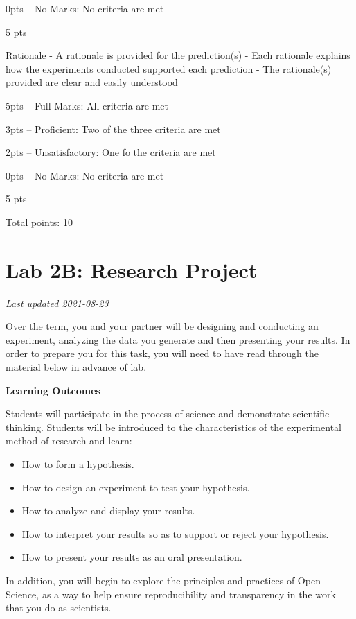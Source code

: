 \documentclass[
]{book}
\providecommand{\tightlist}{%
  \setlength{\itemsep}{0pt}\setlength{\parskip}{0pt}}
\begin{document}
0pts -- No Marks: No criteria are met

5 pts

Rationale
- A rationale is provided for the prediction(s)
- Each rationale explains how the experiments conducted supported each prediction
- The rationale(s) provided are clear and easily understood

5pts -- Full Marks: All criteria are met

3pts -- Proficient: Two of the three criteria are met

2pts -- Unsatisfactory: One fo the criteria are met

0pts -- No Marks: No criteria are met

5 pts

Total points: 10

\hypertarget{lab-2b-research-project}{%
\chapter*{Lab 2B: Research Project}\label{lab-2b-research-project}}

\emph{Last updated 2021-08-23}

Over the term, you and your partner will be designing and conducting an experiment, analyzing the data you generate and then presenting your results. In order to prepare you for this task, you will need to have read through the material below in advance of lab.

\textbf{Learning Outcomes}

Students will participate in the process of science and demonstrate scientific thinking. Students will be introduced to the characteristics of the experimental method of research and learn:

\begin{itemize}
\tightlist
\item
  How to form a hypothesis.
\item
  How to design an experiment to test your hypothesis.
\item
  How to analyze and display your results.
\item
  How to interpret your results so as to support or reject your hypothesis.
\item
  How to present your results as an oral presentation.
\end{itemize}

In addition, you will begin to explore the principles and practices of Open Science, as a way to help ensure reproducibility and transparency in the work that you do as scientists.
\end{document}
